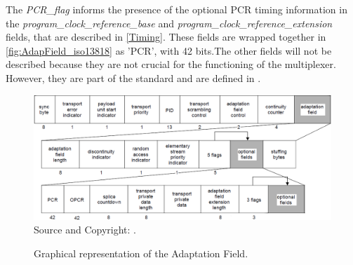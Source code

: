 \documentclass[
	12pt,				%
	openright,			%
	twoside,			%
	a4paper,			%
	brazil,
	french,				%
	english
	]{abntex2}
\begin{document}
The \textit{PCR\_flag} informs the presence of the optional PCR timing information in the \textit{program\_clock\_reference\_base} and \textit{program\_clock\_reference\_extension} fields, that are described in \autoref{Timing}. These fields are wrapped together in \autoref{fig:AdapField_iso13818} as 'PCR', with 42 bits.The other fields will not be described because they are not crucial for the functioning of the multiplexer. However, they are part of the standard and are defined in .

\begin{figure}
\centering
\caption{Graphical representation of the Adaptation Field.}
\includegraphics[width=1\linewidth]{figuras/AdapField_iso13818.png}
\\Source and Copyright: .
\label{fig:AdapField_iso13818}
\end{figure}


\end{document}
